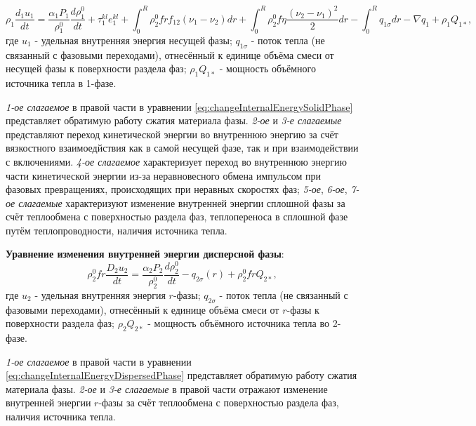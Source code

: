 \documentclass[12pt, a4paper]{report}
\begin{document}
	\begin{equation}\label{eq:changeInternalEnergySolidPhase}
		\rho_{1} \frac{d_{1} u_{1}}{dt} = \frac{\alpha_{1} P_{1}}{\rho_{1}^{0}}\frac{d \rho_{1}^{0}}{dt} + \tau_{1}^{kl} e_{1}^{kl} + \int_{0}^{R} \rho_{2}^{0} f r f_{12} (\nu_{1} - \nu_{2}) dr + \int_{0}^{R} \rho_{2}^{0} f \eta \frac{(\nu_{2} - \nu_{1})^{2}}{2} dr - \int_{0}^{R} q_{1 \sigma} dr - \nabla q_{1} + \rho_{1} Q_{1*},
	\end{equation}
	\large
	где $u_{1}$ - удельная внутренняя энергия несущей фазы; $q_{1 \sigma}$ - поток тепла (не связанный с фазовыми переходами), отнесённый к единице объёма смеси от несущей фазы к поверхности раздела фаз; $\rho_{1} Q_{1*}$ - мощность объёмного источника тепла в 1-фазе. \par
	\textit{1-ое слагаемое} в правой части в уравнении \eqref{eq:changeInternalEnergySolidPhase} представляет обратимую работу сжатия материала фазы. \textit{2-ое} и \textit{3-е слагаемые} представляют переход кинетической энергии во внутреннюю энергию за счёт вязкостного взаимоедйствия как в самой несущей фазе, так и при взаимодействии с включениями. \textit{4-ое слагаемое} характеризует переход во внутреннюю энергию части кинетической энергии из-за неравновесного обмена импульсом при фазовых превращениях, происходящих при неравных скоростях фаз; \textit{5-ое}, \textit{6-ое}, \textit{7-ое слагаемые} характеризуют изменение внутренней энергии сплошной фазы за счёт теплообмена с поверхностью раздела фаз, теплопереноса в сплошной фазе путём теплопроводности, наличия источника тепла. \par
	\textbf{Уравнение изменения внутренней энергии дисперсной фазы}:
	\begin{equation}\label{eq:changeInternalEnergyDispersedPhase}
		\rho_{2}^{0} f r \frac{D_{2} u_{2}}{dt} = \frac{\alpha_{2} P_{2}}{\rho_{2}^{0}}\frac{d \rho_{2}^{0}}{dt} - q_{2 \sigma}(r) + \rho_{2}^{0} f r Q_{2*},
	\end{equation}
	где $u_{2}$ - удельная внутренняя энергия $r$-фазы; $q_{2 \sigma}$ - поток тепла (не связанный с фазовыми переходами), отнесённый к единице объёма смеси от $r$-фазы к поверхности раздела фаз; $\rho_{2} Q_{2*}$ - мощность объёмного источника тепла во 2-фазе. \par
	\textit{1-ое слагаемое} в правой части в уравнении \eqref{eq:changeInternalEnergyDispersedPhase} представляет обратимую работу сжатия материала фазы. \textit{2-ое} и \textit{3-е слагаемые} в правой части отражают изменение внутренней энергии $r$-фазы за счёт теплообмена с поверхностью раздела фаз, наличия источника тепла.
\end{document}
